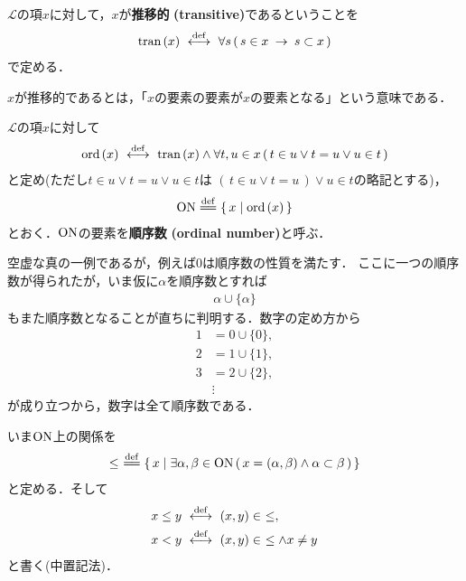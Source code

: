	\begin{screen}
		\begin{dfn}[推移的類]
			$\mathcal{L}$の項$x$に対して，$x$が{\bf 推移的}
			{\bf (transitive)}であるということを
			\begin{align}
				\operatorname*{tran}\hspace{0.15em}(x) \ \overset{\mathrm{def}}{\longleftrightarrow}\ 
				\forall s\, (\, s \in x \hspace{0.25em}\rightarrow\hspace{0.25em} s \subset x\, )
			\end{align}
			で定める．
		\end{dfn}
	\end{screen}
	
	$x$が推移的であるとは，「$x$の要素の要素が$x$の要素となる」という意味である．
	
	\begin{screen}
		\begin{dfn}[順序数]
			$\mathcal{L}$の項$x$に対して
			\begin{align}
				\operatorname*{ord}\hspace{0.15em}(x) \ \overset{\mathrm{def}}{\longleftrightarrow}\  \operatorname*{tran}\hspace{0.15em}(x) \wedge 
				\forall t,u \in x\, (\, t \in u \vee t = u \vee u \in t\, )
			\end{align}
			と定め(ただし$t \in u \vee t = u \vee u \in t$は
			$(\, t \in u \vee t = u\, ) \vee u \in t$の略記とする)，
			\begin{align}
				\ON \defeq \Set{x}{\ord{x}}
			\end{align}
			とおく．$\mathrm{ON}$の要素を{\bf 順序数}\index{じゅんじょすう@順序数}
			{\bf (ordinal number)}と呼ぶ．
		\end{dfn}
	\end{screen}
	
	空虚な真の一例であるが，例えば$0$は順序数の性質を満たす．
	ここに一つの順序数が得られたが，いま仮に$\alpha$を順序数とすれば
	\begin{align}
		\alpha \cup \{\alpha\}
	\end{align}
	もまた順序数となることが直ちに判明する．数字の定め方から
	\begin{align}
		1 &= 0 \cup \{0\}, \\
		2 &= 1 \cup \{1\}, \\
		3 &= 2 \cup \{2\}, \\
		&\vdots
	\end{align}
	が成り立つから，数字は全て順序数である．
	
	いま$\mathrm{ON}$上の関係を
	\begin{align}
		\leq\ \defeq \Set{x}{\exists \alpha,\beta \in \ON\, 
		(\, x=(\alpha,\beta) \wedge \alpha \subset \beta\, )}
	\end{align}
	と定める．そして
	\begin{align}
		x \leq y &\ \overset{\mathrm{def}}{\longleftrightarrow}\  (x,y) \in\ \leq, \\
		x < y &\ \overset{\mathrm{def}}{\longleftrightarrow}\  (x,y) \in\ \leq \wedge x \neq y
	\end{align}
	と書く(中置記法)．
	

